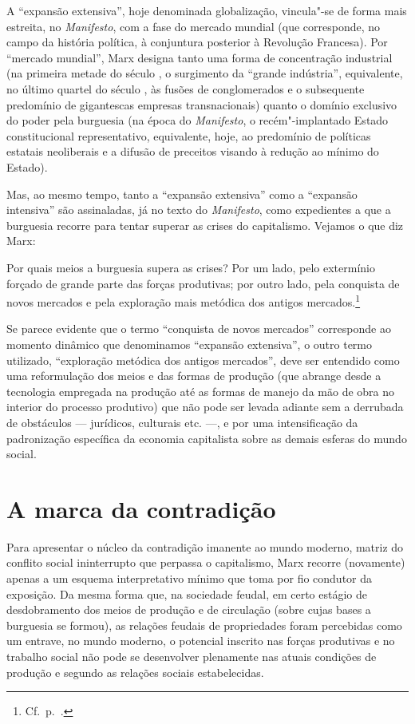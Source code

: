 A “expansão extensiva”, hoje denominada globalização, vincula"-se de
forma mais estreita, no \textit{Manifesto}, com a fase do mercado
mundial (que corresponde, no campo da história política, à conjuntura
posterior à Revolução Francesa). Por “mercado mundial”, Marx designa
tanto uma forma de concentração industrial (na primeira metade do
século , o surgimento da “grande indústria”, equivalente, no último
quartel do século , às fusões de conglomerados e o subsequente
predomínio de gigantescas empresas transnacionais) quanto o domínio
exclusivo do poder pela burguesia (na época do \textit{Manifesto}, o
recém"-implantado Estado constitucional representativo, equivalente,
hoje, ao predomínio de políticas estatais neoliberais e a difusão de
preceitos visando à redução ao mínimo do Estado).

Mas, ao mesmo tempo, tanto a “expansão extensiva” como a “expansão
intensiva” são assinaladas, já no texto do \textit{Manifesto}, como
expedientes a que a burguesia recorre para tentar superar as crises do
capitalismo. Vejamos o que diz Marx:

\begin{hedraquote} 
Por quais meios a burguesia supera as crises? Por um lado, pelo
extermínio forçado de grande parte das forças produtivas; por outro
lado, pela conquista de novos mercados e pela exploração mais metódica
dos antigos mercados.\footnote{ Cf.~p.~\pageref{9}.}
\end{hedraquote} 

Se parece evidente que o termo “conquista de novos mercados” corresponde
ao momento dinâmico que denominamos “expansão extensiva”, o outro termo
utilizado, “exploração metódica dos antigos mercados”, deve ser
entendido como uma reformulação dos meios e das formas de produção (que
abrange desde a tecnologia empregada na produção até as formas de
manejo da mão de obra no interior do processo produtivo) que não
pode ser levada adiante sem a derrubada de obstáculos --- jurídicos,
culturais etc. ---, e por uma intensificação da padronização específica da
economia capitalista sobre as demais esferas do mundo social.

\section*{A marca da contradição}

Para apresentar o núcleo da contradição imanente ao mundo moderno,
matriz do conflito social ininterrupto que perpassa o capitalismo, Marx
recorre (novamente) apenas a um esquema interpretativo mínimo que toma
por fio condutor da exposição. Da mesma forma que, na sociedade feudal,
em certo estágio de desdobramento dos meios de produção e de circulação
(sobre cujas bases a burguesia se formou), as relações feudais de
propriedades foram percebidas como um entrave, no mundo moderno, o
potencial inscrito nas forças produtivas e no trabalho social não pode
se desenvolver plenamente nas atuais condições de produção e segundo as
relações sociais estabelecidas.

